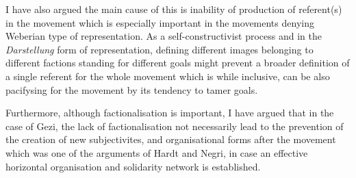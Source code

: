 I have also argued the main cause of this is inability of production of referent(s) in the movement which is especially important in the movements denying Weberian type of representation. As a self-constructivist process and in the \textit{Darstellung} form of representation, defining different images belonging to different factions standing for different goals might prevent a broader definition of a single referent for the whole movement which is while inclusive, can be also pacifysing for the movement by its tendency to tamer goals. 

Furthermore, although factionalisation is important, I have argued that in the
case of Gezi, the lack of factionalisation not necessarily lead to the
prevention of the creation of new subjectivites, and organisational forms after
the movement which was one of the arguments of Hardt and Negri, in case an
effective horizontal organisation and solidarity network is established.
    \printbibliography

